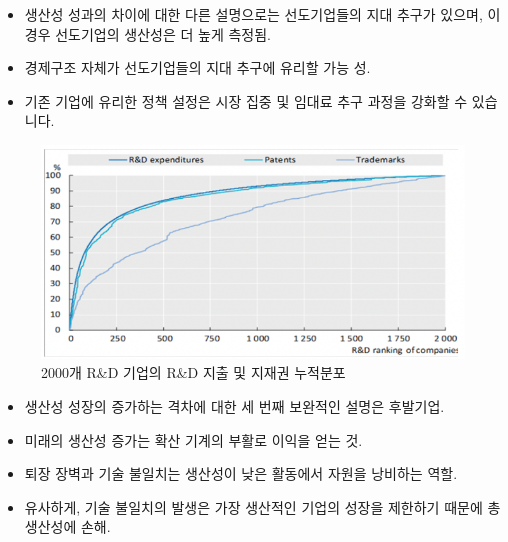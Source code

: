 \documentclass[aspectratio=169,xcolor=dvipsnames,handout]{beamer}
\begin{document}
\begin{frame}{}
    \begin{itemize}
        \item 생산성 성과의 차이에 대한 다른 설명으로는 선도기업들의 지대 추구가 있으며, 이 경우 선도기업의 생산성은 더 높게 측정됨.
        \item 경제구조 자체가 선도기업들의 지대 추구에 유리할 가능 성.
    \end{itemize}
\end{frame}

\begin{frame}{}
    \begin{itemize}
        \item 기존 기업에 유리한 정책 설정은 시장 집중 및 임대료 추구 과정을 강화할 수 있습니다.
    \end{itemize}
    \begin{figure}
        \centering
        \includegraphics[scale=.3]{pic/tpin1.8.png}
        \caption{2000개 R\&D 기업의 R\&D 지출 및 지재권 누적분포}
    \end{figure}
\end{frame}

\begin{frame}{}
    \begin{itemize}
        \item 생산성 성장의 증가하는 격차에 대한 세 번째 보완적인 설명은 후발기업.
        \item 미래의 생산성 증가는 확산 기계의 부활로 이익을 얻는 것.
        \item 퇴장 장벽과 기술 불일치는 생산성이 낮은 활동에서 자원을 낭비하는 역할.
        \item 유사하게, 기술 불일치의 발생은 가장 생산적인 기업의 성장을 제한하기 때문에 총 생산성에 손해.
    \end{itemize}
\end{frame}
\end{document}
